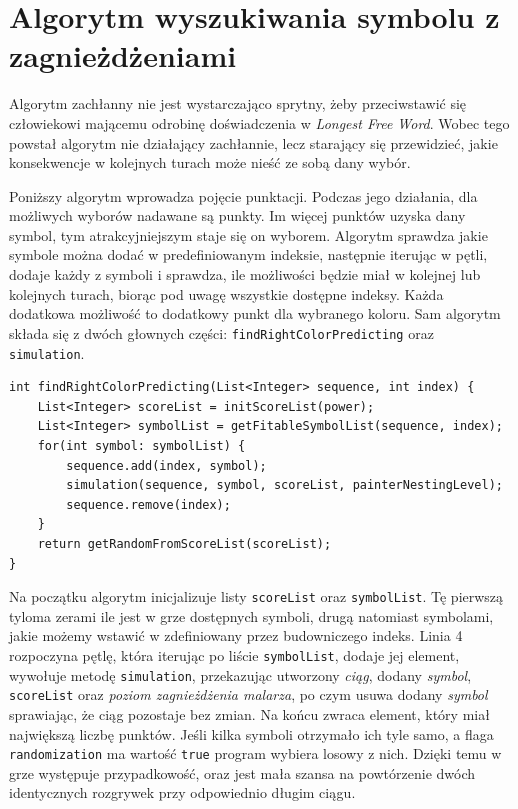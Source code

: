 \documentclass[document]{xmgr}
\begin{document}
\section{Algorytm wyszukiwania symbolu z zagnieżdżeniami}
Algorytm zachłanny nie jest wystarczająco sprytny, żeby przeciwstawić się człowiekowi mającemu odrobinę doświadczenia w \emph{Longest Free Word}. Wobec tego powstał algorytm nie działający zachłannie, lecz starający się przewidzieć, jakie konsekwencje w kolejnych turach może nieść ze sobą dany wybór.

Poniższy algorytm wprowadza pojęcie punktacji. Podczas jego działania, dla możliwych wyborów nadawane są punkty. Im więcej punktów uzyska dany symbol, tym atrakcyjniejszym staje się on wyborem. Algorytm sprawdza jakie symbole można dodać w predefiniowanym indeksie, następnie iterując w pętli, dodaje każdy z symboli i sprawdza, ile możliwości będzie miał w kolejnej lub kolejnych turach, biorąc pod uwagę wszystkie dostępne indeksy. Każda dodatkowa możliwość to dodatkowy punkt dla wybranego koloru. Sam algorytm składa się z dwóch głownych części: \texttt{findRightColorPredicting} oraz \texttt{simulation}.

\begin{lstlisting}[frame=single]
int findRightColorPredicting(List<Integer> sequence, int index) {
	List<Integer> scoreList = initScoreList(power);
	List<Integer> symbolList = getFitableSymbolList(sequence, index);
	for(int symbol: symbolList) {
		sequence.add(index, symbol);
		simulation(sequence, symbol, scoreList, painterNestingLevel);
		sequence.remove(index);
	}
	return getRandomFromScoreList(scoreList);
}
\end{lstlisting}
 
Na początku algorytm inicjalizuje listy \texttt{scoreList} oraz \texttt{symbolList}. Tę pierwszą tyloma zerami ile jest w grze dostępnych symboli, drugą natomiast symbolami, jakie możemy wstawić w zdefiniowany przez budowniczego indeks. Linia 4 rozpoczyna pętlę, która iterując po liście \texttt{symbolList}, dodaje jej element, wywołuje metodę \texttt{simulation}, przekazując utworzony \emph{ciąg}, dodany \emph{symbol}, \texttt{scoreList} oraz \emph{poziom zagnieżdżenia malarza}, po czym usuwa dodany \emph{symbol} sprawiając, że ciąg pozostaje bez zmian. Na końcu zwraca element, który miał największą liczbę punktów. Jeśli kilka symboli otrzymało ich tyle samo, a flaga \texttt{randomization} ma wartość \texttt{true} program wybiera losowy z nich. Dzięki temu w grze występuje przypadkowość, oraz jest mała szansa na powtórzenie dwóch identycznych rozgrywek przy odpowiednio długim ciągu.
\end{document}

